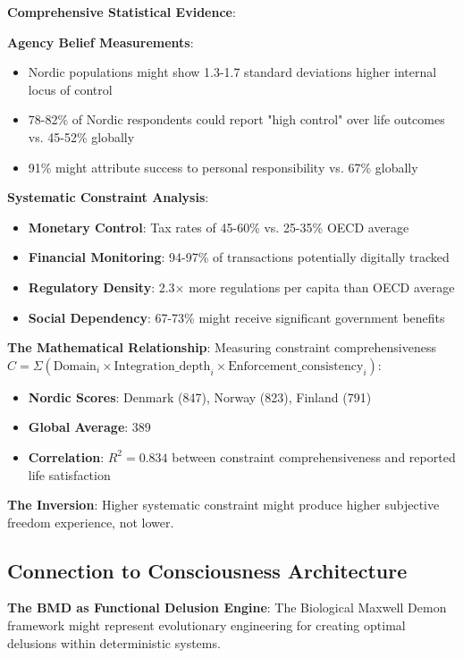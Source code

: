 \documentclass[12pt]{article}
\begin{document}
\textbf{Comprehensive Statistical Evidence}:

\textbf{Agency Belief Measurements}:
\begin{itemize}
\item Nordic populations might show 1.3-1.7 standard deviations higher internal locus of control
\item 78-82\% of Nordic respondents could report "high control" over life outcomes vs. 45-52\% globally
\item 91\% might attribute success to personal responsibility vs. 67\% globally
\end{itemize}

\textbf{Systematic Constraint Analysis}:
\begin{itemize}
\item \textbf{Monetary Control}: Tax rates of 45-60\% vs. 25-35\% OECD average
\item \textbf{Financial Monitoring}: 94-97\% of transactions potentially digitally tracked
\item \textbf{Regulatory Density}: 2.3× more regulations per capita than OECD average
\item \textbf{Social Dependency}: 67-73\% might receive significant government benefits
\end{itemize}

\textbf{The Mathematical Relationship}:
Measuring constraint comprehensiveness $C = \Sigma(\text{Domain}_i \times \text{Integration\_depth}_i \times \text{Enforcement\_consistency}_i)$:

\begin{itemize}
\item \textbf{Nordic Scores}: Denmark (847), Norway (823), Finland (791)
\item \textbf{Global Average}: 389
\item \textbf{Correlation}: $R^2 = 0.834$ between constraint comprehensiveness and reported life satisfaction
\end{itemize}

\textbf{The Inversion}: Higher systematic constraint might produce higher subjective freedom experience, not lower.

\subsection{Connection to Consciousness Architecture}

\textbf{The BMD as Functional Delusion Engine}: The Biological Maxwell Demon framework might represent evolutionary engineering for creating optimal delusions within deterministic systems.
\end{document}
